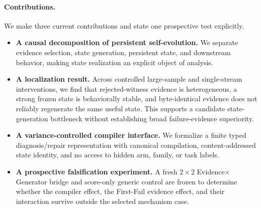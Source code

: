 \paragraph{Contributions.}
We make three current contributions and state one prospective test explicitly.
\begin{itemize}
    \item \textbf{A causal decomposition of persistent self-evolution.} We separate evidence selection, state generation, persistent state, and downstream behavior, making state realization an explicit object of analysis.
    \item \textbf{A localization result.} Across controlled large-sample and single-stream interventions, we find that rejected-witness evidence is heterogeneous, a strong frozen state is behaviorally stable, and byte-identical evidence does not reliably regenerate the same useful state. This supports a candidate state-generation bottleneck without establishing broad failure-evidence superiority.
    \item \textbf{A variance-controlled compiler interface.} We formalize a finite typed diagnosis/repair representation with canonical compilation, content-addressed state identity, and no access to hidden arm, family, or task labels.
    \item \textbf{A prospective falsification experiment.} A fresh $2\times2$ Evidence$\times$Generator bridge and score-only generic control are frozen to determine whether the compiler effect, the First-Fail evidence effect, and their interaction survive outside the selected mechanism case.
\end{itemize}
